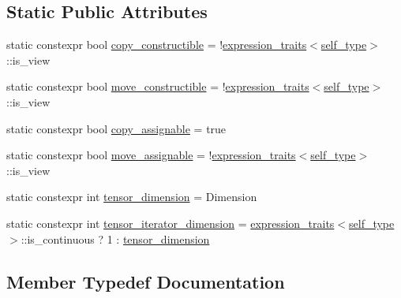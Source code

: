 \subsection*{Static Public Attributes}
\begin{DoxyCompactItemize}
\item 
static constexpr bool \hyperlink{structBC_1_1tensors_1_1exprs_1_1Kernel__Array_a8f9df18a7fb30244dbcaf5da4fe9cc0d}{copy\+\_\+constructible} = !\hyperlink{structBC_1_1tensors_1_1exprs_1_1expression__traits}{expression\+\_\+traits}$<$\hyperlink{structBC_1_1tensors_1_1exprs_1_1Kernel__Array_a48e3325a79c498c34a6825c628a6f401}{self\+\_\+type}$>$\+::is\+\_\+view
\item 
static constexpr bool \hyperlink{structBC_1_1tensors_1_1exprs_1_1Kernel__Array_a04bdb841d9de0f6d9001d3e9610460f4}{move\+\_\+constructible} = !\hyperlink{structBC_1_1tensors_1_1exprs_1_1expression__traits}{expression\+\_\+traits}$<$\hyperlink{structBC_1_1tensors_1_1exprs_1_1Kernel__Array_a48e3325a79c498c34a6825c628a6f401}{self\+\_\+type}$>$\+::is\+\_\+view
\item 
static constexpr bool \hyperlink{structBC_1_1tensors_1_1exprs_1_1Kernel__Array_aba2bd2aa5dfc1bb60b6d08db2949bf7f}{copy\+\_\+assignable} = true
\item 
static constexpr bool \hyperlink{structBC_1_1tensors_1_1exprs_1_1Kernel__Array_aa2686081d657078b7750cf6836e128ca}{move\+\_\+assignable} = !\hyperlink{structBC_1_1tensors_1_1exprs_1_1expression__traits}{expression\+\_\+traits}$<$\hyperlink{structBC_1_1tensors_1_1exprs_1_1Kernel__Array_a48e3325a79c498c34a6825c628a6f401}{self\+\_\+type}$>$\+::is\+\_\+view
\item 
static constexpr int \hyperlink{structBC_1_1tensors_1_1exprs_1_1Kernel__Array_a49172e5da206759267e0e546758da091}{tensor\+\_\+dimension} = Dimension
\item 
static constexpr int \hyperlink{structBC_1_1tensors_1_1exprs_1_1Kernel__Array_ad66157af0fa9827e66c9f962039cc31e}{tensor\+\_\+iterator\+\_\+dimension} = \hyperlink{structBC_1_1tensors_1_1exprs_1_1expression__traits}{expression\+\_\+traits}$<$\hyperlink{structBC_1_1tensors_1_1exprs_1_1Kernel__Array_a48e3325a79c498c34a6825c628a6f401}{self\+\_\+type}$>$\+::is\+\_\+continuous ? 1 \+: \hyperlink{structBC_1_1tensors_1_1exprs_1_1Kernel__Array_a49172e5da206759267e0e546758da091}{tensor\+\_\+dimension}
\end{DoxyCompactItemize}


\subsection{Member Typedef Documentation}
